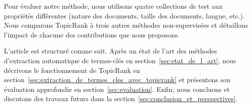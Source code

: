   Pour évaluer notre méthode, nous utilisons quatre collections de test aux
  propriétés différentes (nature des documents, taille des documents, langue,
  etc.). Nous comparons TopicRank à trois autres méthodes non-supervisées et
  détaillons l'impact de chacune des contributions que nous proposons.

  L'article est structuré comme suit. Après un état de l'art des méthodes
  d'extraction automatique de termes-clés en section~\ref{sec:etat_de_l_art},
  nous décrivons le fonctionnement de TopicRank en
  section~\ref{sec:extraction_de_termes_cles_avec_topicrank} et présentons son
  évaluation approfondie en section~\ref{sec:evaluation}. Enfin, nous concluons
  et discutons des travaux futurs dans la
  section~\ref{sec:conclusion_et_perspectives}.
